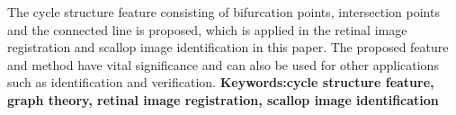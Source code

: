 {The cycle structure feature consisting of bifurcation points, intersection points and the connected line is proposed, which is applied in the retinal image registration and scallop image identification in this paper. The proposed feature and method have vital significance and can also be used for other applications such as identification and verification.
}
\vskip12bp
{\xiaosi\heiti\noindent 
\textbf{Keywords:\enskip cycle structure feature, graph theory, retinal image registration, scallop image identification}}
